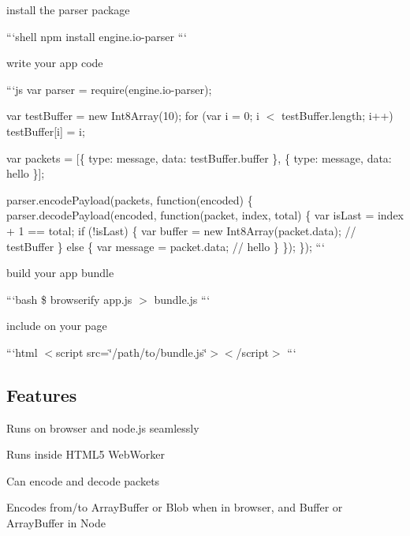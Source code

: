 \begin{DoxyEnumerate}
\item install the parser package

```shell npm install engine.\+io-\/parser ```
\end{DoxyEnumerate}
\begin{DoxyEnumerate}
\item write your app code

```js var parser = require(\textquotesingle{}engine.\+io-\/parser\textquotesingle{});

var test\+Buffer = new Int8\+Array(10); for (var i = 0; i $<$ test\+Buffer.\+length; i++) test\+Buffer\mbox{[}i\mbox{]} = i;

var packets = \mbox{[}\{ type\+: \textquotesingle{}message\textquotesingle{}, data\+: test\+Buffer.\+buffer \}, \{ type\+: \textquotesingle{}message\textquotesingle{}, data\+: \textquotesingle{}hello\textquotesingle{} \}\mbox{]};

parser.\+encode\+Payload(packets, function(encoded) \{ parser.\+decode\+Payload(encoded, function(packet, index, total) \{ var is\+Last = index + 1 == total; if (!is\+Last) \{ var buffer = new Int8\+Array(packet.\+data); // test\+Buffer \} else \{ var message = packet.\+data; // \textquotesingle{}hello\textquotesingle{} \} \}); \}); ```
\end{DoxyEnumerate}
\begin{DoxyEnumerate}
\item build your app bundle

```bash \$ browserify app.\+js $>$ bundle.\+js ```
\end{DoxyEnumerate}
\begin{DoxyEnumerate}
\item include on your page

```html $<$script src=\char`\"{}/path/to/bundle.\+js\char`\"{}$>$$<$/script$>$ ```
\end{DoxyEnumerate}

\subsection*{Features}


\begin{DoxyItemize}
\item Runs on browser and node.\+js seamlessly
\item Runs inside H\+T\+M\+L5 Web\+Worker
\item Can encode and decode packets
\begin{DoxyItemize}
\item Encodes from/to Array\+Buffer or Blob when in browser, and Buffer or Array\+Buffer in Node
\end{DoxyItemize}
\end{DoxyItemize}

